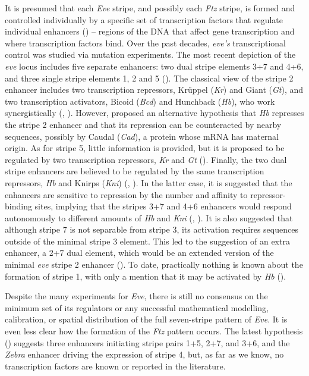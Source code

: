 \documentclass[final,authoryear, 5p, times]{elsarticle}
\begin{document}
It is presumed that each \textit{Eve} stripe, and possibly each \textit{Ftz} stripe, is formed and controlled individually by a specific set of transcription factors that regulate individual enhancers  (\cite{Nuss}) -- regions of the DNA that affect gene transcription and where transcription factors bind. Over the past decades, \textit{eve's} transcriptional control was studied via mutation experiments.   The most recent depiction of the \textit{eve} locus includes five separate enhancers: two dual stripe elements 3+7 and 4+6, and three single stripe elements 1, 2 and 5 (\cite{Lim2018}). The classical view of the stripe 2 enhancer includes two transcription repressors, Krüppel (\textit{Kr}) and Giant (\textit{Gt}), and two transcription activators, Bicoid (\textit{Bcd}) and Hunchback (\textit{Hb}), who work synergistically (\cite{Small1992},  \cite{SIMPSONBROSE1994855}). However, \cite{Vincent2018HunchbackIC} proposed an alternative hypothesis that \textit{Hb} represses the stripe 2 enhancer and that its repression can be counteracted by nearby sequences, possibly by Caudal (\textit{Cad}), a protein whose mRNA has maternal origin. As for stripe 5, little information is provided, but it is proposed to be regulated by two transcription repressors, \textit{Kr} and \textit{Gt} (\cite{Fuji}). Finally, the two dual stripe enhancers are believed to be regulated by the same transcription repressors, \textit{Hb} and Knirps (\textit{Kni}) (\cite{SMALL1996314}, \cite{Fuji}). In the latter case, it is suggested that the enhancers are sensitive to repression by the number and affinity to repressor-binding sites, implying that the stripes 3+7 and 4+6 enhancers would respond autonomously to different amounts of \textit{Hb} and \textit{Kni} (\cite{Clyde}, \cite{Crocker2016QuantitativelyPC}). It is also suggested that although stripe 7 is not separable from stripe 3, its activation requires sequences outside of the minimal stripe 3 element. This led to the suggestion of an extra enhancer, a 2+7 dual element, which would be an extended version of the minimal \textit{eve} stripe 2 enhancer (\cite{Vincent2018HunchbackIC}). 
 To date, practically nothing is known about the formation of stripe 1, with only a mention that it may be activated by \textit{Hb} (\cite{Fuji}).


Despite the many experiments for \textit{Eve}, there is still no consensus on the minimum set of its regulators or any successful mathematical modelling, calibration, or spatial distribution of the full seven-stripe pattern of \textit{Eve}. It is even less clear how the formation of the \textit{Ftz} pattern occurs. The latest hypothesis (\cite{Schroeder2}) suggests three enhancers initiating stripe pairs 1+5, 2+7, and 3+6, and the   \textit{Zebra} enhancer driving the expression of stripe 4, but, as far as we know, no transcription factors are known or reported in the literature. 
\end{document}
